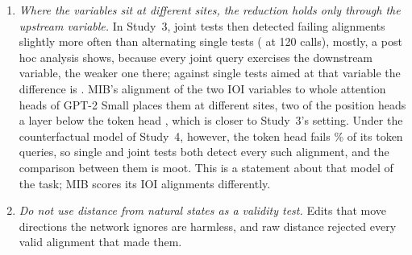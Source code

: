 \begin{enumerate}
  and applied unchanged, all \MsPerfectJointFailWord{} of Study~3's (both computed post hoc); in Study~4 it flagged all
  \PerfectWordM{} of GPT-2 Medium's and \DFlagged{} of the \DJointOnly{} joint-only alignments of arm d, with no false
  flag. These counts are small, and the rule is meant only for alignments that pass their single queries, which in
  GPT-2 are few. Because one gradient per single query serves all joint queries built on it, the rule is cheap once a
  single census has been taken; at budgets of a few dozen queries it is not, and a joint test guided by it did worse
  than a plain single test (\cref{sec:strategies}).
  \item \emph{Where the variables sit at different sites, the reduction holds only through the upstream variable.} In
  Study~3, joint tests then detected failing alignments slightly more often than alternating single tests
  (\MsContrast{} \MsContrastCI{} at 120 calls), mostly, a post hoc analysis shows, because every joint query exercises
  the downstream variable, the weaker one there; against single tests aimed at that variable the difference is
  \MsMechWorse. MIB's alignment of the two IOI variables to whole attention heads of GPT-2 Small places them at
  different sites, two of the position heads a layer below the token head \citep{mueller2025mib}, which is closer to
  Study~3's setting. Under the counterfactual model of Study~4, however, the token head fails \HeadsRateB\% of its
  token queries, so single and joint tests both detect every such alignment, and the comparison between them is
  moot. This is a statement about that model of the task; MIB scores its IOI alignments differently.
  \item \emph{Do not use distance from natural states as a validity test.} Edits that move directions the network
  ignores are harmless, and raw distance rejected every valid alignment that made them.
\end{enumerate}

